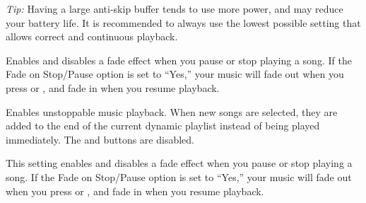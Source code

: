 \begin{description}
{    

    \emph{Tip: }Having a large anti-skip buffer tends to use more power, and may reduce your 
      battery life. It is recommended to always use the lowest possible setting that allows 
      correct and continuous playback.

    \item[Fade On Stop/Pause: ]Enables and disables a fade effect when you pause or stop 
      playing a song.  If the Fade on Stop/Pause option is set to ``Yes,'' your music will 
      fade out when you press  or , and fade in when you resume playback.

    \item[Party Mode: ]Enables unstoppable music playback.  When new songs are selected, they are 
      added to the end of the current dynamic playlist instead of being played immediately.  
      The  and  buttons are disabled.

    \item[Fade On Stop/Pause: ]
      This setting enables and disables a fade effect when you pause or stop playing a song.  
      If the Fade on Stop/Pause option is set to ``Yes,'' your music will fade out when you 
      press  or , and fade in when you resume playback.

}
\end{description}
